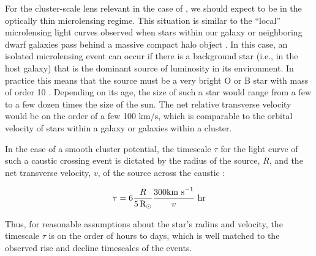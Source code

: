 For the cluster-scale lens relevant in the case of \spock, we should
expect to be in the optically thin microlensing regime.  This
situation is similar to the ``local'' microlensing light curves
observed when stars within our galaxy or neighboring dwarf galaxies
pass behind a massive compact halo object \citep{Paczynski:1986,
  Alcock:1993, Aubourg:1993, Udalski:1993}.  In this case, an isolated
microlensing event can occur if there is a background star (i.e., in
the \spock host galaxy) that is the dominant source of luminosity in
its environment. In practice this means that the source must be a very
bright O or B star with mass of order 10 \Msun.  Depending on its age,
the size of such a star would range from a few to a few dozen times
the size of the sun.  The net relative transverse velocity would be on
the order of a few 100 km/s, which is comparable to the orbital
velocity of stars within a galaxy or galaxies within a cluster.

In the case of a smooth cluster potential, the timescale $\tau$ for
the light curve of such a caustic crossing event is dictated by the
radius of the source, $R$, and the net transverse velocity, $v$, of
the source across the caustic
\citep{Chang:1979,Chang:1984,MiraldaEscude:1991}:

\begin{equation}
  \tau = 6\frac{R}{5\,\mbox{R$_{\odot}$}}\frac{300 {\rm km~ s}^{-1}}{v}~\rm{hr}
\label{eqn:caustic_crossing_time}
\end{equation}

\noindent Thus, for reasonable assumptions about the star's radius and
velocity, the timescale $\tau$ is on the order of hours to days, which is well
matched to the observed rise and decline timescales of the \spock
events.


